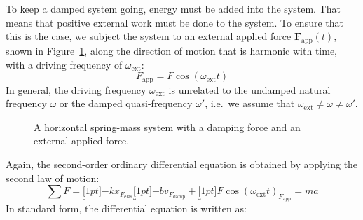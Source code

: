 To keep a damped system going, energy must be added into the system. That means
that positive external work must be done to the system. To ensure that this is
the case, we subject the system to an external applied force
$\bm F_\text{app}(t)$, shown in Figure~\ref{fig:driven1}, along the direction of
motion that is harmonic with time, with a driving frequency of
$\omega_\text{ext}$:
\begin{equation}
  F_\text{app}=F\cos(\omega_\text{ext}t)
\end{equation}
In general, the driving frequency $\omega_\text{ext}$ is unrelated to the
undamped natural frequency $\omega$ or the damped quasi-frequency $\omega'$,
i.e.\ we assume that $\omega_\text{ext}\neq\omega\neq\omega'$.
\begin{figure}[ht]
  \centering
  \caption{A horizontal spring-mass system with a damping force and an external
    applied force.}
  \label{fig:driven1}
\end{figure}
Again, the second-order ordinary differential equation is obtained by
applying the second law of motion:
\begin{equation}
  \sum F=
  \underbracket[1pt]{-kx}_{F_\text{elas}}\underbracket[1pt]{-bv}_{F_\text{damp}}+
  \underbracket[1pt]{F\cos(\omega_\text{ext}t)}_{F_\text{app}}=ma
\end{equation}
In standard form, the differential equation is written as:
